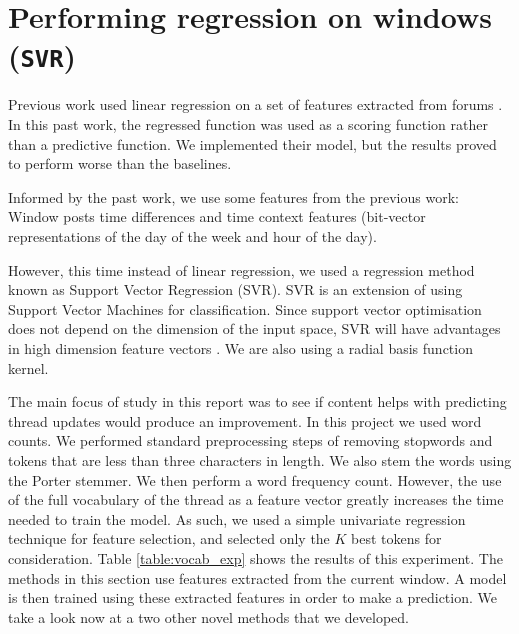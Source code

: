 \section{Performing regression on windows (\texttt{SVR})}
Previous work used linear regression on a set of features extracted from forums 
\cite{Yang2009}. In this past work, the regressed function 
was used as a scoring function rather than a predictive function. We implemented 
their model, but the results proved to perform worse than the baselines.

Informed by the past work, we use some features from the previous work: Window 
posts time differences and time context features (bit-vector representations of 
the day of the week and hour of the day).

However, this time instead of linear regression, we used a regression method 
known as Support Vector Regression (SVR). SVR is an extension of using Support 
Vector Machines for classification. Since support vector optimisation does not 
depend on the dimension of the input space, SVR will have advantages in high 
dimension feature vectors \cite{drucker1997}. We are also using a radial basis 
function kernel.

The main focus of study in this report was to see if content helps with 
predicting thread updates would produce an improvement. In this project we used 
word counts. We performed standard preprocessing steps of removing stopwords and 
tokens that are less than three characters in length. We also stem the words 
using the Porter stemmer.
We then perform a word frequency count. However, the use 
of the full vocabulary of the thread as a feature vector greatly increases the 
time needed to train the model.
 As such, we used a simple univariate regression 
technique for feature selection, and selected only the $K$ best tokens for 
consideration. Table \ref{table:vocab_exp} shows the results of this experiment.  
The methods in this section use features extracted from the current window. A 
model is then trained using these extracted features in order to make a 
prediction. We take a look now at a two other novel methods that we developed.

